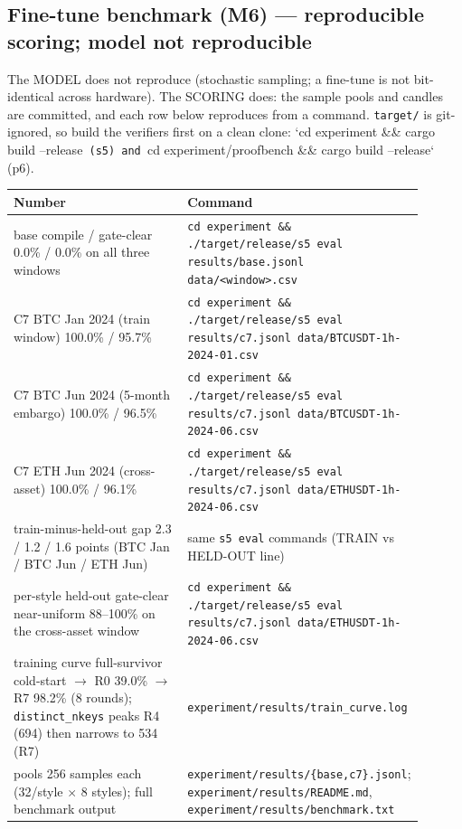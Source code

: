 \documentclass[11pt]{article}
\newcommand{\code}[1]{\texttt{#1}}
\begin{document}
\subsection*{Fine-tune benchmark (M6) --- reproducible scoring; model not reproducible}

The MODEL does not reproduce (stochastic sampling; a fine-tune is not
bit-identical across hardware). The SCORING does: the sample pools and candles
are committed, and each row below reproduces from a command. \code{target/} is
git-ignored, so build the verifiers first on a clean clone: `cd experiment \&\&
cargo build --release\code{ (s5) and }cd experiment/proofbench \&\& cargo build
--release` (p6).

\begingroup\small
\begin{longtable}{p{0.450\linewidth} p{0.450\linewidth}}
\toprule
\textbf{Number} & \textbf{Command} \\
\midrule\endhead
base compile / gate-clear 0.0\% / 0.0\% on all three windows & \code{cd experiment \&\& ./target/release/s5 eval results/base.jsonl data/<window>.csv} \\
C7 BTC Jan 2024 (train window) 100.0\% / 95.7\% & \code{cd experiment \&\& ./target/release/s5 eval results/c7.jsonl data/BTCUSDT-1h-2024-01.csv} \\
C7 BTC Jun 2024 (5-month embargo) 100.0\% / 96.5\% & \code{cd experiment \&\& ./target/release/s5 eval results/c7.jsonl data/BTCUSDT-1h-2024-06.csv} \\
C7 ETH Jun 2024 (cross-asset) 100.0\% / 96.1\% & \code{cd experiment \&\& ./target/release/s5 eval results/c7.jsonl data/ETHUSDT-1h-2024-06.csv} \\
train-minus-held-out gap 2.3 / 1.2 / 1.6 points (BTC Jan / BTC Jun / ETH Jun) & same \code{s5 eval} commands (TRAIN vs HELD-OUT line) \\
per-style held-out gate-clear near-uniform 88--100\% on the cross-asset window & \code{cd experiment \&\& ./target/release/s5 eval results/c7.jsonl data/ETHUSDT-1h-2024-06.csv} \\
training curve full-survivor cold-start $\rightarrow$ R0 39.0\% $\rightarrow$ R7 98.2\% (8 rounds); \code{distinct\_nkeys} peaks R4 (694) then narrows to 534 (R7) & \code{experiment/results/train\_curve.log} \\
pools 256 samples each (32/style $\times$ 8 styles); full benchmark output & \code{experiment/results/\{base,c7\}.jsonl}; \code{experiment/results/README.md}, \code{experiment/results/benchmark.txt} \\

\end{longtable}
\end{document}
